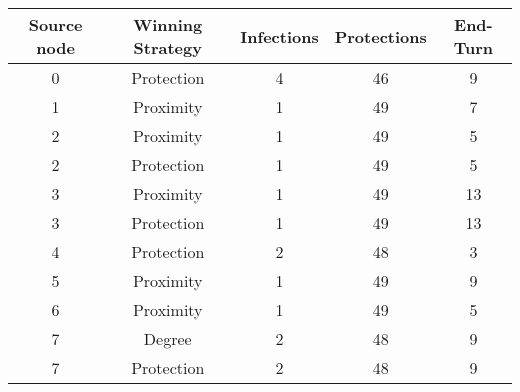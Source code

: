 \documentclass[results.tex]{subfiles}
\begin{document}
    \begin{center}
        \begin{tabular}{| c || c | c | c | c |}
            \hline
            {\bfseries Source node} & {\bfseries Winning Strategy} & {\bfseries Infections} & {\bfseries Protections}
            & {\bfseries End-Turn}
            \\  %
            \hline\hline
            0                       & Protection                   & 4                      & 46                      & 9                    \\
            \hline
            1                       & Proximity                    & 1                      & 49                      & 7                    \\
            \hline
            2                       & Proximity                    & 1                      & 49                      & 5                    \\
            \hline
            2                       & Protection                   & 1                      & 49                      & 5                    \\
            \hline
            3                       & Proximity                    & 1                      & 49                      & 13                   \\
            \hline
            3                       & Protection                   & 1                      & 49                      & 13                   \\
            \hline
            4                       & Protection                   & 2                      & 48                      & 3                    \\
            \hline
            5                       & Proximity                    & 1                      & 49                      & 9                    \\
            \hline
            6                       & Proximity                    & 1                      & 49                      & 5                    \\
            \hline
            7                       & Degree                       & 2                      & 48                      & 9                    \\
            \hline
            7                       & Protection                   & 2                      & 48                      & 9                    \\

\end{tabular}
\end{center}
\end{document}
